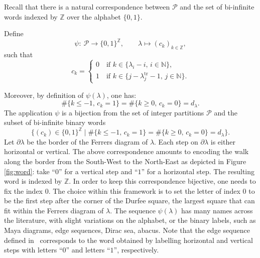 \documentclass[10pt,a4paper]{amsart}
\numberwithin{equation}{section}
\def\ccp{\mathcal P}
\newcommand{\Z}{\mathbb{Z}}
\newcommand{\N}{\mathbb{N}}
\begin{document}
Recall that there is a natural correspondence between $\ccp$ and the set of bi-infinite words indexed by $\Z$ over the alphabet $\lbrace 0,1\rbrace$.
\begin{Definition}\label{def:psi}
Define
\[
\psi\colon \   \ccp   \to   \lbrace 0,1\rbrace^{\Z}, \qquad
   \lambda  \mapsto  (c_k)_{k\in\Z},
\]
such that
 \[c_k=\begin{cases}
 0 \quad \text{if } k\in\lbrace \lambda_i-i,\, i\in\N\rbrace,\\
 1 \quad \text{if } k\in \lbrace j-\lambda_j^{\mathrm{tr}}-1,\, j\in\N\rbrace.
 \end{cases}\]
\end{Definition}
Moreover, by definition of $\psi(\lambda)$, one has:
\begin{equation}\label{eq:balance}
\#\{k\leq-1,\, c_k=1\}= \#\{k\geq0,\, c_k=0\}=d_\lambda.
\end{equation}
 The application $\psi$ is a bijection from the set of integer partitions $\ccp$ and the subset of bi-infinite binary words
 \[\bigl\lbrace (c_k)\in\lbrace 0,1\rbrace^{\Z}\mid \#\{k\leq-1,\,c_k=1\}= \#\{k\geq0,\,c_k=0\}=d_\lambda\bigr\rbrace.\]
 Let $\partial \lambda$ be the border of the Ferrers diagram of $\lambda$. Each step on $\partial\lambda$ is either horizontal or vertical. The above correspondence amounts to encoding the walk along the border from the South-West to the North-East as depicted in Figure \ref{fig:word}: take ``$0$'' for a vertical step and ``$1$'' for a horizontal step. The resulting word is indexed by $\Z$. In order to keep this correspondence bijective, one needs to fix the index $0$. The choice within this framework is to set the letter of index $0$ to be the first step after the corner of the Durfee square, the largest square that can fit within the Ferrers diagram of $\lambda$. The sequence $\psi(\lambda)$ has many names across the literature, with slight variations on the alphabet, or the binary labels, such as Maya diagrams, edge sequences, Dirac sea, abacus. Note that the edge sequence defined in~\cite{LLMSmem} corresponds to the word obtained by labelling horizontal and vertical steps with letters ``$0$'' and letters ``$1$'', respectively.
\end{document}
